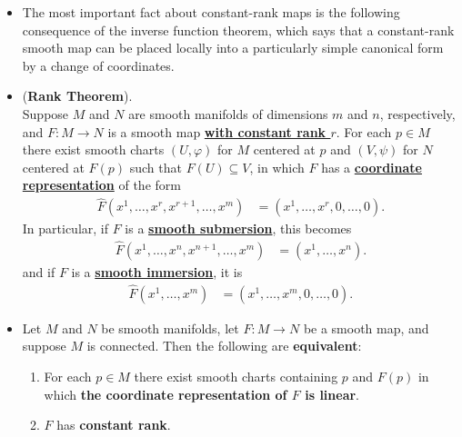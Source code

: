 \documentclass[11pt]{article}
\begin{document}
\begin{itemize}
\item The most important fact about constant-rank maps is the following consequence of the inverse function theorem, which says that a constant-rank smooth map can be
placed locally into a particularly simple canonical form by a change of coordinates.

\item \begin{theorem} (\textbf{Rank Theorem}). \citep{lee2003introduction} \\
Suppose $M$ and $N$ are smooth manifolds of dimensions $m$ and $n$, respectively, and  $F: M \rightarrow N$ is a smooth map \underline{\textbf{with constant rank $r$}}. For each $p \in M$ there exist smooth charts $(U, \varphi)$ for $M$ centered at $p$ and $(V,\psi)$ for $N$ centered at $F(p)$ such that $F(U) \subseteq V$, in which $F$ has a \underline{\textbf{coordinate representation}} of the form
\begin{align}
\widehat{F}(x^1,\ldots, x^r, x^{r+1},\ldots, x^m) &= (x^1,\ldots, x^r, 0,\ldots, 0).  \label{eqn: rank_theorem_coordinate_rep}
\end{align} In particular, if $F$ is a \underline{\textbf{smooth submersion}}, this becomes
\begin{align}
\widehat{F}(x^1,\ldots, x^n, x^{n+1},\ldots, x^m) &=  (x^1,\ldots, x^n).  \label{eqn: rank_theorem_coordinate_rep_subm}
\end{align}
and if $F$ is a \underline{\textbf{smooth immersion}}, it is
\begin{align}
\widehat{F}(x^1,\ldots, x^m) &=  (x^1,\ldots, x^m, 0,\ldots, 0).  \label{eqn: rank_theorem_coordinate_rep_imm}
\end{align}
\end{theorem}

\item \begin{corollary}
Let $M$ and $N$ be smooth manifolds, let  $F: M \rightarrow N$ be a smooth map, and suppose $M$ is connected. Then the following are \textbf{equivalent}:
\begin{enumerate}
\item For each $p \in M$ there exist smooth charts containing $p$ and $F(p)$ in which \textbf{the coordinate representation of $F$ is linear}.
\item $F$ has \textbf{constant rank}.
\end{enumerate}
\end{corollary}


\end{itemize}
\end{document}
